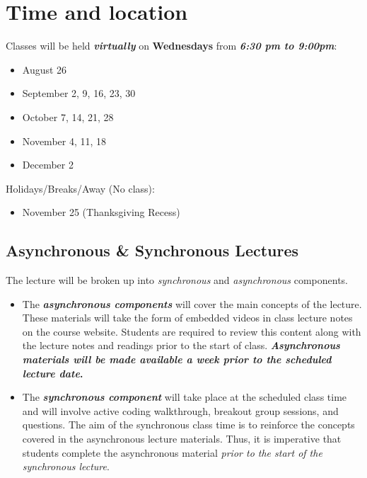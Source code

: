 \documentclass[
  12pt,
]{article}
\providecommand{\tightlist}{%
  \setlength{\itemsep}{0pt}\setlength{\parskip}{0pt}}
\begin{document}
\hypertarget{time-and-location}{%
\section{Time and location}\label{time-and-location}}

Classes will be held \textbf{\emph{virtually}} on \textbf{Wednesdays}
from \textbf{\emph{6:30 pm to 9:00pm}}:

\begin{itemize}
\tightlist
\item
  August 26
\item
  September 2, 9, 16, 23, 30
\item
  October 7, 14, 21, 28
\item
  November 4, 11, 18
\item
  December 2
\end{itemize}

Holidays/Breaks/Away (No class):

\begin{itemize}
\tightlist
\item
  November 25 (Thanksgiving Recess)
\end{itemize}

\hypertarget{asynchronous-synchronous-lectures}{%
\subsection{Asynchronous \& Synchronous
Lectures}\label{asynchronous-synchronous-lectures}}

The lecture will be broken up into \emph{synchronous} and
\emph{asynchronous} components.

\begin{itemize}
\tightlist
\item
  The \textbf{\emph{asynchronous components}} will cover the main
  concepts of the lecture. These materials will take the form of
  embedded videos in class lecture notes on the course website. Students
  are required to review this content along with the lecture notes and
  readings prior to the start of class. \textbf{\emph{Asynchronous
  materials will be made available a \textbf{week prior} to the
  scheduled lecture date}.}
\item
  The \textbf{\emph{synchronous component}} will take place at the
  scheduled class time and will involve active coding walkthrough,
  breakout group sessions, and questions. The aim of the synchronous
  class time is to reinforce the concepts covered in the asynchronous
  lecture materials. Thus, it is imperative that students complete the
  asynchronous material \emph{prior to the start of the synchronous
  lecture}.
\end{itemize}
\end{document}
